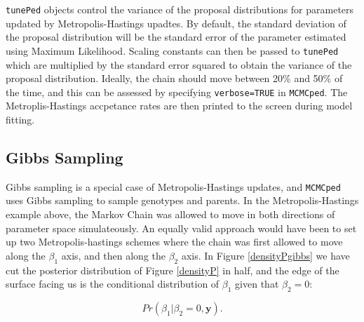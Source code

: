 \documentclass{article}
\begin{document}
\texttt{tunePed} objects control the variance of the proposal distributions for parameters updated by Metropolis-Hastings upadtes.  By default, the standard deviation of the proposal distribution will be the standard error of the parameter estimated using Maximum Likelihood.  Scaling constants can then be passed to \texttt{tunePed} which are multiplied by the standard error squared to obtain the variance of the proposal distribution.  Ideally, the chain should move between 20\% and 50\% of the time, and this can be assessed by specifying \texttt{verbose=TRUE} in \texttt{MCMCped}.  The Metroplis-Hastings accpetance rates are then printed to the screen during model fitting.
 
\subsection{Gibbs Sampling}

Gibbs sampling is a special case of Metropolis-Hastings updates, and \texttt{MCMCped} uses Gibbs sampling to sample genotypes and parents.  In the Metropolis-Hastings example above, the Markov Chain was allowed to move in both directions of parameter space simulateously.  An equally valid approach would have been to set up two Metropolis-hastings schemes where the chain was first allowed to move along the $\beta_{1}$ axis, and then along the $\beta_{2}$ axis. In Figure \ref{densityPgibbs} we have cut the posterior distribution of Figure \ref{densityP} in half, and the edge of the surface facing us is the conditional distribution of $\beta_{1}$ given that $\beta_{2}=0$: 

\begin{equation}
Pr(\beta_{1}|\beta_{2}=0, \bm{y}).
\end{equation}
\end{document}
